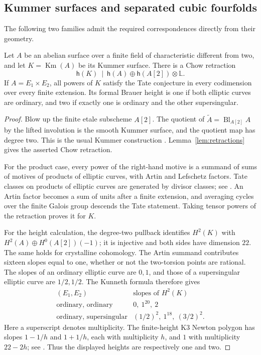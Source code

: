 \subsection{Kummer surfaces and separated cubic fourfolds}

The following two families admit the required correspondences
directly from their geometry.

\begin{proposition}\label{prop:kummer}
Let $A$ be an abelian surface over a finite field of characteristic
different from two, and let $K=\operatorname{Km}(A)$ be its Kummer
surface. There is a Chow retraction
\[
 \mathsf h(K)\ \mid\
 \mathsf h(A)\oplus\mathsf h(A[2])\otimes\mathbb L.
\]
If $A=E_1\times E_2$, all powers of $K$ satisfy the Tate conjecture
in every codimension over every finite extension. Its formal Brauer
height is one if both elliptic curves are ordinary, and two if exactly
one is ordinary and the other supersingular.
\end{proposition}

\begin{proof}
Blow up the finite etale subscheme $A[2]$. The quotient of
$\widetilde A=\operatorname{Bl}_{A[2]}A$ by the lifted involution
is the smooth Kummer surface, and the quotient map has degree two.
This is the usual Kummer construction
\citep[Chapter 1, Example 1.3(iii), author draft pp.~8--9]{Huybrechts2016}.
Lemma~\ref{lem:retractions} gives the asserted Chow retraction.

For the product case, every power of the right-hand motive is a
summand of sums of motives of products of elliptic curves, with
Artin and Lefschetz factors. Tate classes on products of elliptic
curves are generated by divisor classes; see
\citet[Appendix A.7, first example, pp.~158--159]{Milne2001}.
An Artin factor becomes a sum of units after a finite extension, and
averaging cycles over the finite Galois group descends the Tate
statement. Taking tensor powers of the retraction proves it for $K$.

For the height calculation, the degree-two pullback identifies
$H^2(K)$ with $H^2(A)\oplus H^0(A[2])(-1)$; it is injective and
both sides have dimension $22$. The same holds for crystalline
cohomology. The Artin summand contributes sixteen slopes equal to
one, whether or not the two-torsion points are rational. The slopes
of an ordinary elliptic curve are $0,1$,
and those of a supersingular elliptic curve are $1/2,1/2$.
The Kunneth formula therefore gives
\[
 \begin{array}{c|c}
 (E_1,E_2)&\text{slopes of }H^2(K)\\ \hline
 \text{ordinary, ordinary}&0,\ 1^{20},\ 2\\
 \text{ordinary, supersingular}&(1/2)^2,\ 1^{18},\ (3/2)^2.
 \end{array}
\]
Here a superscript denotes multiplicity. The finite-height K3
Newton polygon has slopes $1-1/h$ and $1+1/h$, each with
multiplicity $h$, and $1$ with multiplicity $22-2h$;
see \citet[Chapter 18, \S3.2--3.3, author draft pp.~399--401]{Huybrechts2016}.
Thus the displayed heights are respectively one and two.
\end{proof}

